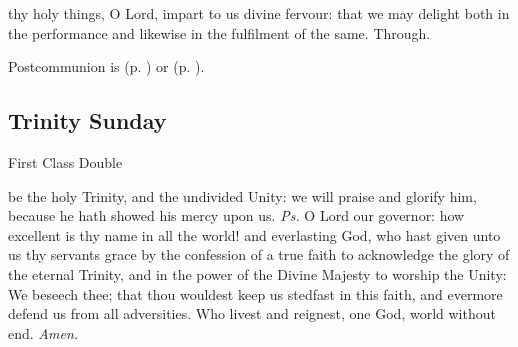 
\postcommunion
{} thy holy things, O Lord, impart to us divine fervour: that we may delight both in the performance and likewise in the fulfilment of the same. Through.
\begin{rubric}
     Postcommunion is  (p. \pageref{SPAgainst}) or  (p. \pageref{SPChiefBishop}).
\end{rubric}


\subsection{Trinity Sunday}
\begin{inhead}
    {First Class Double}
\end{inhead}
\fancyhead[RE,LO]{}


\introit
{} be the holy Trinity, and the undivided Unity: we will praise and glorify him, because he hath showed his mercy upon us. \textit{Ps.} O Lord our governor: how excellent is thy name in all the world!
\collect
{} and everlasting God, who hast given unto us thy servants grace by the confession of a true faith to acknowledge the glory of the eternal Trinity, and in the power of the Divine Majesty to worship the Unity: We beseech thee; that thou wouldest keep us stedfast in this faith, and evermore defend us from all adversities. Who livest and reignest, one God, world without end. \textit{Amen.}
%


